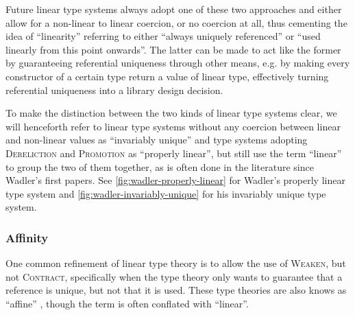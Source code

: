 Future linear type systems \citep{goos_observers_1992} \citep{atkey_syntax_2018} \citep{bernardy_linear_2018} \citep{brady_idris_2021} \citep{choudhury_graded_2021} \citep{li_linear_2022} \citep{spiwack_linearly_2022} always adopt one of these two approaches and either allow for a non-linear to linear coercion, or no coercion at all, thus cementing the idea of ``linearity'' referring to either ``always uniquely referenced'' or ``used linearly from this point onwards''. The latter can be made to act like the former by guaranteeing referential uniqueness through other means, e.g. by making every constructor of a certain type return a value of linear type, effectively turning referential uniqueness into a library design decision.

To make the distinction between the two kinds of linear type systems clear, we will henceforth refer to linear type systems without any coercion between linear and non-linear values as ``invariably unique'' and type systems adopting \textsc{Dereliction} and \textsc{Promotion} as ``properly linear'', but still use the term ``linear'' to group the two of them together, as is often done in the literature since Wadler's first papers. See \cref{fig:wadler-properly-linear} for Wadler's properly linear type system and \cref{fig:wadler-invariably-unique} for his invariably unique type system.

\subsubsection{Affinity}
One common refinement of linear type theory is to allow the use of \textsc{Weaken}, but not \textsc{Contract}, specifically when the type theory only wants to guarantee that a reference is unique, but not that it is used. These type theories are also knows as ``affine'' \citep{tov_practical_2011}, though the term is often conflated with ``linear''.

